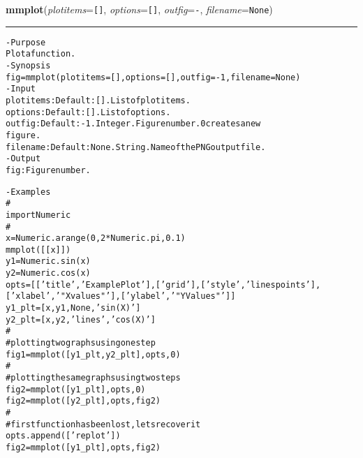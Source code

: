     \begin{boxedminipage}{\textwidth}

    \raggedright \textbf{mmplot}(\textit{plotitems}=\texttt{[\-]\-}, \textit{options}=\texttt{[\-]\-}, \textit{outfig}=\texttt{-\-}, \textit{filename}=\texttt{N\-o\-n\-e\-})

    \vspace{-1.5ex}

    \rule{\textwidth}{0.5\fboxrule}
\begin{alltt}
- Purpose
    Plot a function.
- Synopsis
    fig = mmplot(plotitems=[], options=[], outfig=-1, filename=None)
- Input
    plotitems: Default: []. List of plotitems.
    options:   Default: []. List of options.
    outfig:    Default: -1. Integer. Figure number. 0 creates a new
               figure.
    filename:  Default: None. String. Name of the PNG output file.
- Output
    fig: Figure number.

- Examples
    \#
    import Numeric
    \#
    x = Numeric.arange(0, 2*Numeric.pi, 0.1)
    mmplot([[x]])
    y1 = Numeric.sin(x)
    y2 = Numeric.cos(x)
    opts = [['title', 'Example Plot'],                    ['grid'],                    ['style', 'linespoints'],                    ['xlabel', '"X values"'],                    ['ylabel', '"Y Values"']]
    y1\_plt = [x, y1, None,    'sin(X)']
    y2\_plt = [x, y2, 'lines', 'cos(X)']
    \#
    \# plotting two graphs using one step
    fig1 = mmplot([y1\_plt, y2\_plt], opts, 0)
    \#
    \# plotting the same graphs using two steps
    fig2 = mmplot([y1\_plt], opts, 0)
    fig2 = mmplot([y2\_plt], opts, fig2)
    \#
    \# first function has been lost, lets recover it
    opts.append(['replot'])
    fig2 = mmplot([y1\_plt], opts, fig2)\end{alltt}

    \vspace{1ex}

    \end{boxedminipage}

    \label{multireg:num_pymorph:mmreadgray}
    \vspace{0.5ex}

